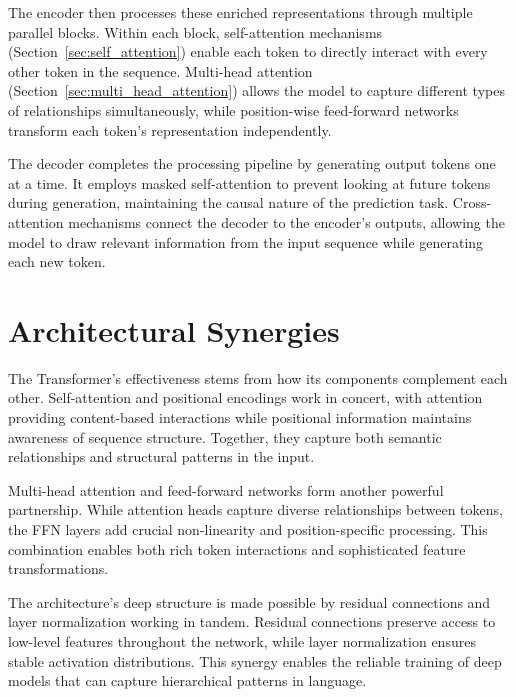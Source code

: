 The encoder then processes these enriched representations through multiple parallel blocks. Within each block, self-attention mechanisms (Section~\ref{sec:self_attention}) enable each token to directly interact with every other token in the sequence. Multi-head attention (Section~\ref{sec:multi_head_attention}) allows the model to capture different types of relationships simultaneously, while position-wise feed-forward networks transform each token's representation independently.

The decoder completes the processing pipeline by generating output tokens one at a time. It employs masked self-attention to prevent looking at future tokens during generation, maintaining the causal nature of the prediction task. Cross-attention mechanisms connect the decoder to the encoder's outputs, allowing the model to draw relevant information from the input sequence while generating each new token.

\section{Architectural Synergies}
\noindent
The Transformer's effectiveness stems from how its components complement each other. Self-attention and positional encodings work in concert, with attention providing content-based interactions while positional information maintains awareness of sequence structure. Together, they capture both semantic relationships and structural patterns in the input.

Multi-head attention and feed-forward networks form another powerful partnership. While attention heads capture diverse relationships between tokens, the FFN layers add crucial non-linearity and position-specific processing. This combination enables both rich token interactions and sophisticated feature transformations.

The architecture's deep structure is made possible by residual connections and layer normalization working in tandem. Residual connections preserve access to low-level features throughout the network, while layer normalization ensures stable activation distributions. This synergy enables the reliable training of deep models that can capture hierarchical patterns in language.


